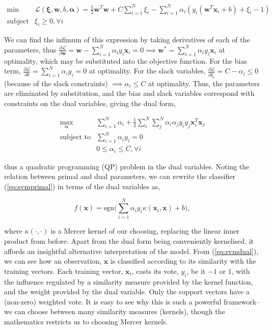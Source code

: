\documentclass[11pt]{amsart}
\begin{document}
$$
\begin{array}{rl}
\min &  \mathcal{L}({\boldsymbol\xi, \mathbf{w}, b,  \boldsymbol\alpha}) =  \frac{1}{2}\mathbf{w}^T\mathbf{w} + C\sum_{i = 1}^{N}\xi_i - \sum_{i=1}^N \alpha_i(y_i(\mathbf{w}^T\mathbf{x}_i + b) + \xi_i - 1) \\
\text{subject to} & \xi_i \geq 0, \forall i
\end{array}
$$


We can find the infimum of this expression by taking derivatives of each of the parameters, thus $\frac{\partial \mathcal{L}}{\partial \mathbf{w}} = \mathbf{w} - \sum_{i=1}^N \alpha_iy_i\mathbf{x}_i = 0 \implies \mathbf{w}^* = \sum_{i=1}^N \alpha_iy_i\mathbf{x}_i$ at optimality, which may be substituted into the objective function. For the bias term, $\frac{\partial \mathcal{L}}{\partial b} = \sum_{i=1}^N \alpha_iy_i = 0$ at optimality. For the slack variables, 
$\frac{\partial\mathcal{L}}{\partial\xi_i} = C - \alpha_i \leq 0$ (because of the slack constraints) $\implies \alpha_i \leq C$ at optimality. Thus, the parameters are eliminated by substitution, and the bias and slack variables correspond with constraints on the dual variables, giving the dual form,

\begin{equation}
\begin{array}{rl}
\max_{\boldsymbol\alpha} & \sum_{i = 1}^{N}\alpha_i + \frac{1}{2}\sum_{i}^N\sum_{j}^N \alpha_i\alpha_jy_iy_j\mathbf{x}_i^T\mathbf{x}_j \\
\text{subject to} & \sum_{i=1}^N \alpha_iy_i = 0 \\
& 0 \leq \alpha_i \leq C, \forall i
\end{array}
\label{eq:dual}
\end{equation}

thus a quadratic programming (QP) problem in the dual variables. Noting the relation between primal and dual parameters, we can rewrite the classifier (\ref{eq:svmprimal}) in terms of the dual variables as,

\begin{equation}
f(\mathbf{x}) = \text{sgn}\Bigg(\sum_{i=1}^N \alpha_iy_i\kappa(\mathbf{x}_i, \mathbf{x}) + b\Bigg),
\label{eq:svmdual}
\end{equation}

where $\kappa(\cdot, \cdot)$ is a Mercer kernel of our choosing, replacing the linear inner product from before. Apart from the dual form being conveniently kernelised, it affords an insightful alternative interpretation of the model. From (\ref{eq:svmdual}), we can see how an observation, $\mathbf{x}$ is classified according to its similarity with the training vectors. Each training vector, $\mathbf{x}_i$, casts its vote, $y_i$, be it $-1$ or $1$, with the influence regulated by a similarity measure provided by the kernel function, and the weight provided by the dual variable. Only the support vectors have a (non-zero) weighted vote. It is easy to see why this is such a powerful framework--we can choose between many similarity measures (kernels), though the mathematics restricts us to choosing Mercer kernels.
\end{document}
